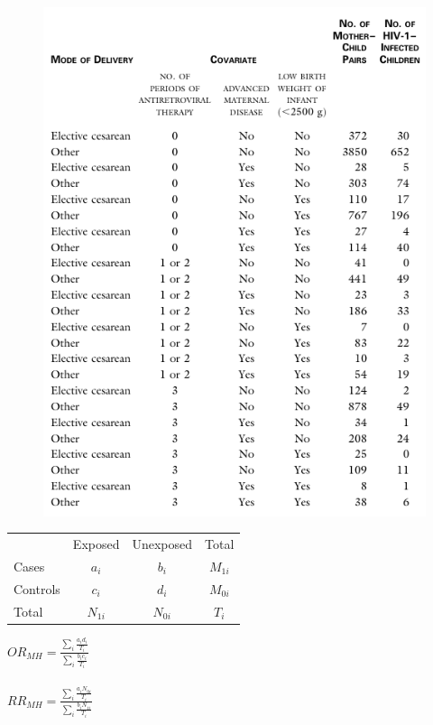 \documentclass[landscape,twocolumn,letterpaper,9pt,reqno]{article}\usepackage[]{graphicx}\usepackage[]{color}
\begin{document}
\begin{figure}[h]
	\centering
	\includegraphics[scale=1.1]{hivtable.pdf}
\end{figure}




\begin{table}[H]
	\centering
	\begin{tabular}{lcc|c}
			     & Exposed  &   Unexposed & Total  \\		
		Cases    & $a_i$ &  $b_i$ & $M_{1i}$ \\
		Controls & $c_i$ 	& $d_i$  	& $M_{0i}$ 	\\	
		\hline
		Total & $N_{1i}$ & $N_{0i}$ 	& $T_i$
	\end{tabular}
\end{table}


$OR_{MH} = \frac{\sum_i \frac{a_i d_i}{T_i}}{\sum_i \frac{b_i c_i}{T_i}}$ \\ \ \\
$RR_{MH} = \frac{\sum_i \frac{a_i N_{0i}}{T_i}}{\sum_i \frac{b_i N_{1i}}{T_i}}$
\end{document}
